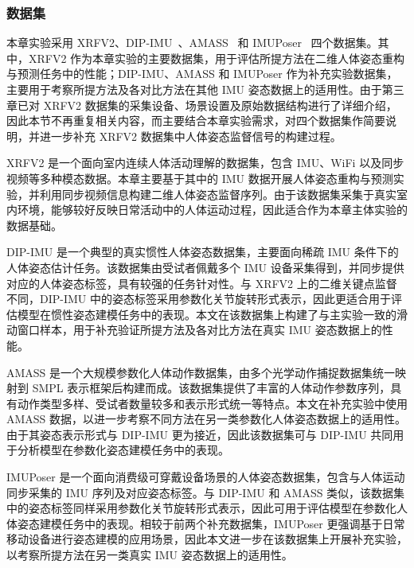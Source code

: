 
\subsubsection{数据集}{}

本章实验采用 XRFV2、DIP-IMU~\cite{huang2018deep}、AMASS~\cite{mahmood2019amass} 和 IMUPoser~\cite{mollyn2023imuposer} 四个数据集。其中，XRFV2 作为本章实验的主要数据集，用于评估所提方法在二维人体姿态重构与预测任务中的性能；DIP-IMU、AMASS 和 IMUPoser 作为补充实验数据集，主要用于考察所提方法及各对比方法在其他 IMU 姿态数据上的适用性。由于第三章已对 XRFV2 数据集的采集设备、场景设置及原始数据结构进行了详细介绍，因此本节不再重复相关内容，而主要结合本章实验需求，对四个数据集作简要说明，并进一步补充 XRFV2 数据集中人体姿态监督信号的构建过程。

XRFV2 是一个面向室内连续人体活动理解的数据集，包含 IMU、WiFi 以及同步视频等多种模态数据。本章主要基于其中的 IMU 数据开展人体姿态重构与预测实验，并利用同步视频信息构建二维人体姿态监督序列。由于该数据集采集于真实室内环境，能够较好反映日常活动中的人体运动过程，因此适合作为本章主体实验的数据基础。

DIP-IMU 是一个典型的真实惯性人体姿态数据集，主要面向稀疏 IMU 条件下的人体姿态估计任务。该数据集由受试者佩戴多个 IMU 设备采集得到，并同步提供对应的人体姿态标签，具有较强的任务针对性。与 XRFV2 上的二维关键点监督不同，DIP-IMU 中的姿态标签采用参数化关节旋转形式表示，因此更适合用于评估模型在惯性姿态建模任务中的表现。本文在该数据集上构建了与主实验一致的滑动窗口样本，用于补充验证所提方法及各对比方法在真实 IMU 姿态数据上的性能。

AMASS 是一个大规模参数化人体动作数据集，由多个光学动作捕捉数据集统一映射到 SMPL 表示框架后构建而成。该数据集提供了丰富的人体动作参数序列，具有动作类型多样、受试者数量较多和表示形式统一等特点。本文在补充实验中使用 AMASS 数据，以进一步考察不同方法在另一类参数化人体姿态数据上的适用性。由于其姿态表示形式与 DIP-IMU 更为接近，因此该数据集可与 DIP-IMU 共同用于分析模型在参数化姿态建模任务中的表现。

IMUPoser 是一个面向消费级可穿戴设备场景的人体姿态数据集，包含与人体运动同步采集的 IMU 序列及对应姿态标签。与 DIP-IMU 和 AMASS 类似，该数据集中的姿态标签同样采用参数化关节旋转形式表示，因此可用于评估模型在参数化人体姿态建模任务中的表现。相较于前两个补充数据集，IMUPoser 更强调基于日常移动设备进行姿态建模的应用场景，因此本文进一步在该数据集上开展补充实验，以考察所提方法在另一类真实 IMU 姿态数据上的适用性。

